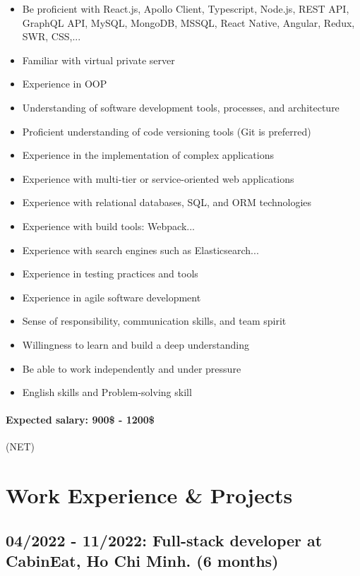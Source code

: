 \documentclass[10pt]{article} %
\begin{document}
\begin{itemize}
  \item Be proficient with React.js, Apollo Client, Typescript, Node.js, REST API, GraphQL API, MySQL, MongoDB, MSSQL, React Native, Angular, Redux, SWR, CSS,...
  \item Familiar with virtual private server
  \item Experience in OOP
  \item Understanding of software development tools, processes, and architecture
  \item Proficient understanding of code versioning tools (Git is preferred)
  \item Experience in the implementation of complex applications
  \item Experience with multi-tier or service-oriented web applications
  \item Experience with relational databases, SQL, and ORM technologies
  \item Experience with build tools: Webpack...
  \item Experience with search engines such as Elasticsearch...
  \item Experience in testing practices and tools
  \item Experience in agile software development
  \item Sense of responsibility, communication skills, and team spirit
  \item Willingness to learn and build a deep understanding
  \item Be able to work independently and under pressure
  \item English skills and Problem-solving skill
\end{itemize}

\paragraph{Expected salary: 900\$ - 1200\$} (NET)

\section{Work Experience \& Projects}

\subsection*{04/2022 - 11/2022: Full-stack developer at CabinEat, Ho Chi Minh. (6 months)}
\end{document}
